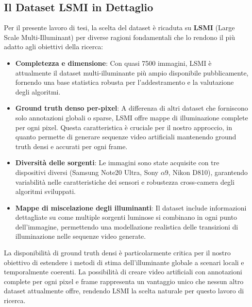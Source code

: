 \subsection{Il Dataset LSMI in Dettaglio}

Per il presente lavoro di tesi, la scelta del dataset è ricaduta su \textbf{LSMI} (Large Scale Multi-Illuminant) \cite{kim_large_2021} per diverse ragioni fondamentali che lo rendono il più adatto agli obiettivi della ricerca:

\begin{itemize}
\item \textbf{Completezza e dimensione}: Con quasi 7500 immagini, LSMI è attualmente il dataset multi-illuminante più ampio disponibile pubblicamente, fornendo una base statistica robusta per l'addestramento e la valutazione degli algoritmi.

\item \textbf{Ground truth denso per-pixel}: A differenza di altri dataset che forniscono solo annotazioni globali o sparse, LSMI offre mappe di illuminazione complete per ogni pixel. Questa caratteristica è cruciale per il nostro approccio, in quanto permette di generare sequenze video artificiali mantenendo ground truth densi e accurati per ogni frame.

\item \textbf{Diversità delle sorgenti}: Le immagini sono state acquisite con tre dispositivi diversi (Samsung Note20 Ultra, Sony $\alpha$9, Nikon D810), garantendo variabilità nelle caratteristiche dei sensori e robustezza cross-camera degli algoritmi sviluppati.

\item \textbf{Mappe di miscelazione degli illuminanti}: Il dataset include informazioni dettagliate su come multiple sorgenti luminose si combinano in ogni punto dell'immagine, permettendo una modellazione realistica delle transizioni di illuminazione nelle sequenze video generate.
\end{itemize}

La disponibilità di ground truth densi è particolarmente critica per il nostro obiettivo di estendere i metodi di stima dell'illuminante globale a scenari locali e temporalmente coerenti. La possibilità di creare video artificiali con annotazioni complete per ogni pixel e frame rappresenta un vantaggio unico che nessun altro dataset attualmente offre, rendendo LSMI la scelta naturale per questo lavoro di ricerca.

